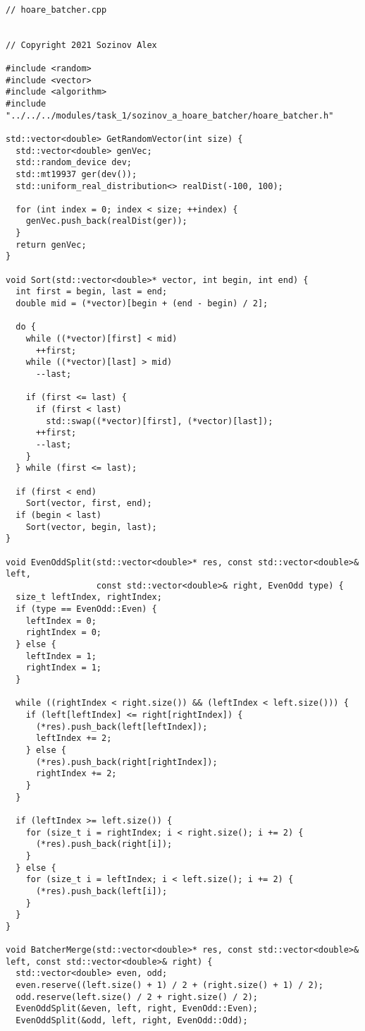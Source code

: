 \documentclass{report}
\begin{document}
\begin{lstlisting}

// hoare_batcher.cpp


// Copyright 2021 Sozinov Alex

#include <random>
#include <vector>
#include <algorithm>
#include "../../../modules/task_1/sozinov_a_hoare_batcher/hoare_batcher.h"

std::vector<double> GetRandomVector(int size) {
  std::vector<double> genVec;
  std::random_device dev;
  std::mt19937 ger(dev());
  std::uniform_real_distribution<> realDist(-100, 100);

  for (int index = 0; index < size; ++index) {
    genVec.push_back(realDist(ger));
  }
  return genVec;
}

void Sort(std::vector<double>* vector, int begin, int end) {
  int first = begin, last = end;
  double mid = (*vector)[begin + (end - begin) / 2];

  do {
    while ((*vector)[first] < mid)
      ++first;
    while ((*vector)[last] > mid)
      --last;

    if (first <= last) {
      if (first < last)
        std::swap((*vector)[first], (*vector)[last]);
      ++first;
      --last;
    }
  } while (first <= last);

  if (first < end)
    Sort(vector, first, end);
  if (begin < last)
    Sort(vector, begin, last);
}

void EvenOddSplit(std::vector<double>* res, const std::vector<double>& left,
                  const std::vector<double>& right, EvenOdd type) {
  size_t leftIndex, rightIndex;
  if (type == EvenOdd::Even) {
    leftIndex = 0;
    rightIndex = 0;
  } else {
    leftIndex = 1;
    rightIndex = 1;
  }

  while ((rightIndex < right.size()) && (leftIndex < left.size())) {
    if (left[leftIndex] <= right[rightIndex]) {
      (*res).push_back(left[leftIndex]);
      leftIndex += 2;
    } else {
      (*res).push_back(right[rightIndex]);
      rightIndex += 2;
    }
  }

  if (leftIndex >= left.size()) {
    for (size_t i = rightIndex; i < right.size(); i += 2) {
      (*res).push_back(right[i]);
    }
  } else {
    for (size_t i = leftIndex; i < left.size(); i += 2) {
      (*res).push_back(left[i]);
    }
  }
}

void BatcherMerge(std::vector<double>* res, const std::vector<double>& left, const std::vector<double>& right) {
  std::vector<double> even, odd;
  even.reserve((left.size() + 1) / 2 + (right.size() + 1) / 2);
  odd.reserve(left.size() / 2 + right.size() / 2);
  EvenOddSplit(&even, left, right, EvenOdd::Even);
  EvenOddSplit(&odd, left, right, EvenOdd::Odd);


\end{lstlisting}
\end{document}
